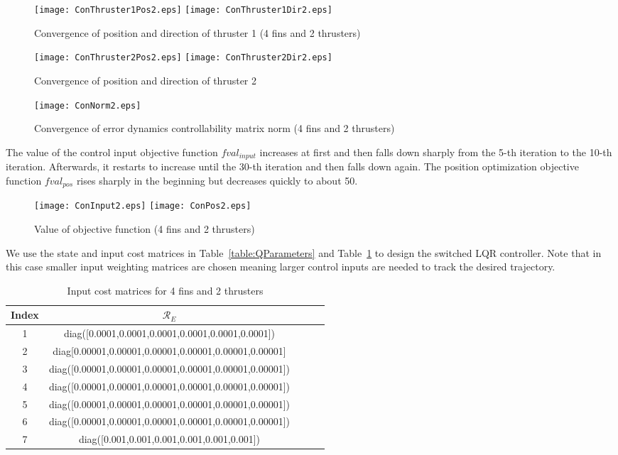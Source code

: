 \begin{figure}
\texttt{[image: ConThruster1Pos2.eps]}
\texttt{[image: ConThruster1Dir2.eps]}
\caption{Convergence of position and direction of thruster 1 (4 fins and 2 thrusters)}	
\label{FIG:ConThruster12}
\end{figure}
\begin{figure}
\texttt{[image: ConThruster2Pos2.eps]}
\texttt{[image: ConThruster2Dir2.eps]}
\caption{Convergence of position and direction of thruster 2}	
\label{FIG:ConThruster22}
\end{figure}
\begin{figure}
\centering
\texttt{[image: ConNorm2.eps]}
\caption{Convergence of error dynamics controllability matrix norm (4 fins and 2 thrusters)}	
\label{FIG:ConNorm2}
\end{figure}
\newpage
The value of the control input objective function $fval_{input}$ increases at first and then falls down sharply from the 5-th iteration to the 10-th iteration. Afterwards, it restarts to increase until the 30-th iteration and then falls down again. The position optimization objective function $fval_{pos}$ rises sharply in the beginning but decreases quickly to about 50. 
\begin{figure}
\center
\texttt{[image: ConInput2.eps]}
\texttt{[image: ConPos2.eps]}
\caption{Value of objective function (4 fins and 2 thrusters)}	
\label{FIG:ConPosInput2}
\end{figure}
\newpage
We use the state and input cost matrices in Table~\ref{table:QParameters} and Table~\ref{table:RParameters for 4 fins and 2 thrusters} to design the switched LQR controller. Note that in this case smaller input weighting matrices are chosen meaning larger control inputs are needed to track the desired trajectory.  
\begin{table}
\centering
\small
\caption{Input cost matrices for 4 fins and 2 thrusters}
\begin{tabular}{| c | c | c | c | p{0.5cm} |}
\hline
Index&$\mathcal{R}_{E}$ \\ \hline
1&diag([0.0001,0.0001,0.0001,0.0001,0.0001,0.0001])\\ \hline
2&diag[0.00001,0.00001,0.00001,0.00001,0.00001,0.00001] \\ \hline
3&diag([0.00001,0.00001,0.00001,0.00001,0.00001,0.00001])\\ \hline
4&diag([0.00001,0.00001,0.00001,0.00001,0.00001,0.00001]) \\ \hline
5&diag([0.00001,0.00001,0.00001,0.00001,0.00001,0.00001])\\ \hline
6&diag([0.00001,0.00001,0.00001,0.00001,0.00001,0.00001])\\ \hline
7&diag([0.001,0.001,0.001,0.001,0.001,0.001]) \\ \hline
\end{tabular}
\label{table:RParameters for 4 fins and 2 thrusters}
\end{table}

